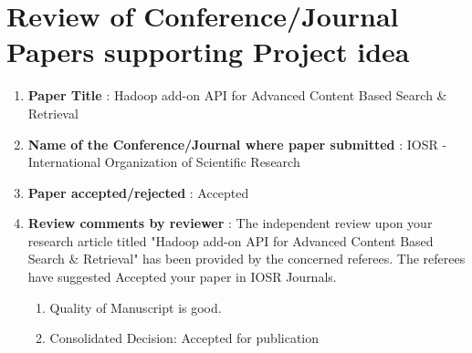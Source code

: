 \documentclass[oneside,a4paper,12pt]{report}
\begin{document}
\section{Review of Conference/Journal Papers supporting Project idea}
\label{sec:survey}
\begin{enumerate}
\item \textbf{Paper Title } : Hadoop add-on API for Advanced Content Based Search \& Retrieval 
\item \textbf{Name of the Conference/Journal where paper submitted } : IOSR - International Organization of Scientific Research
\item \textbf{Paper accepted/rejected } : Accepted
\item \textbf{Review comments by reviewer} : The independent review upon your research article titled "Hadoop add-on API for Advanced Content Based Search \& Retrieval" has been provided by the concerned referees. The referees have suggested Accepted your paper in IOSR Journals.
	\begin{enumerate}
		\item Quality of Manuscript is good.
		\item Consolidated Decision: Accepted for publication 
	\end{enumerate}
	
\end{enumerate}
\end{document}
